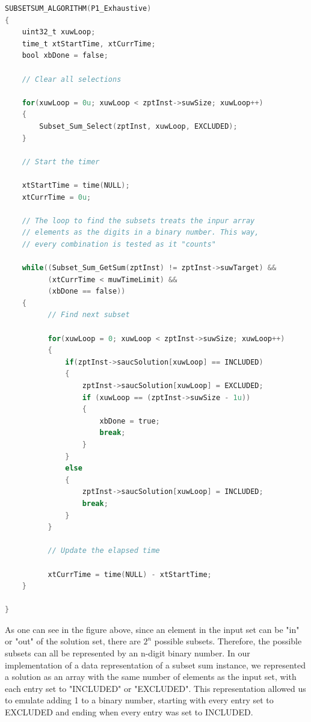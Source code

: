 \documentclass{article}
\begin{document}
\begin{lstlisting}[language=C, caption=Iterative Exhaustive Implementation]
SUBSETSUM_ALGORITHM(P1_Exhaustive)
{
    uint32_t xuwLoop;
    time_t xtStartTime, xtCurrTime;
    bool xbDone = false;

    // Clear all selections

    for(xuwLoop = 0u; xuwLoop < zptInst->suwSize; xuwLoop++)
    {
        Subset_Sum_Select(zptInst, xuwLoop, EXCLUDED);
    }

    // Start the timer

    xtStartTime = time(NULL);
    xtCurrTime = 0u;

    // The loop to find the subsets treats the inpur array 
    // elements as the digits in a binary number. This way,
    // every combination is tested as it "counts"

    while((Subset_Sum_GetSum(zptInst) != zptInst->suwTarget) &&
          (xtCurrTime < muwTimeLimit) &&
          (xbDone == false))
    {
          // Find next subset

          for(xuwLoop = 0; xuwLoop < zptInst->suwSize; xuwLoop++)
          {
              if(zptInst->saucSolution[xuwLoop] == INCLUDED)
              {
                  zptInst->saucSolution[xuwLoop] = EXCLUDED;
                  if (xuwLoop == (zptInst->suwSize - 1u))
                  {
                      xbDone = true;
                      break;
                  }
              }
              else
              {
                  zptInst->saucSolution[xuwLoop] = INCLUDED;
                  break;
              }
          }

          // Update the elapsed time

          xtCurrTime = time(NULL) - xtStartTime;
    }

}
\end{lstlisting}

As one can see in the figure above, since an element in the input set can be "in" or
"out" of the solution set, there are $2^{n}$ possible subsets. Therefore, the possible
subsets can all be represented by an n-digit binary number. In our implementation of a 
data representation of a subset sum instance, we represented a solution as an array with
the same number of elements as the input set, with each entry set to "INCLUDED" or
"EXCLUDED". This representation allowed us to emulate adding 1 to a binary number,
starting with every entry set to EXCLUDED and ending when every entry was set to INCLUDED.
\end{document}
